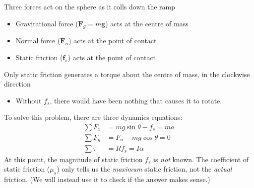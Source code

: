 Three forces act on the sphere as it rolls down the ramp
\begin{itemize}
\item Gravitational force ($\bm F_g=m\bm g$) acts at the centre of mass
\item Normal force ($\bm F_n$) acts at the point of contact
\item Static friction ($\bm f_s$) acts at the point of contact
\end{itemize}
Only static friction generates a torque about the centre of mass, in the clockwise
direction
\begin{itemize}
\item Without $f_s$, there would have been nothing that causes it to rotate.
\end{itemize}
%    

To solve this problem, there are three dynamics equations:
\begin{align}
  \sum F_x&=mg\sin\theta-f_s=ma\\
  \sum F_y&=F_n-mg\cos\theta=0\\
  \sum\tau &=Rf_s=I\alpha
\end{align}
At this point, the magnitude of static friction $f_s$ is \emph{not} known. The
coefficient of static friction ($\mu_s$) only tells us the \emph{maximum}
static friction, not the \emph{actual} friction. (We will instead use it to
check if the answer makes sense.)
  




%  
%    
%    
%
%    
%
%
%


%    
%    
%
%
%    
%




